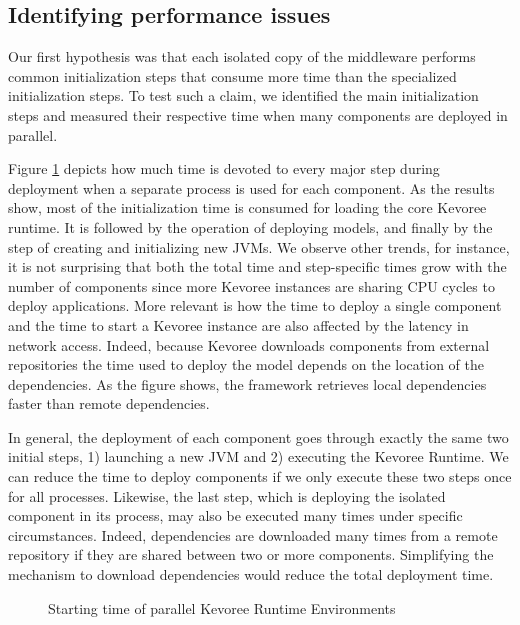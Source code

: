 \subsection{Identifying performance issues} \label{sec:bottlenecks}
Our first hypothesis was that each isolated copy of the middleware performs common initialization steps that consume more time than the specialized initialization steps.
To test such a claim, we identified the main initialization steps and measured their respective time when many components are deployed in parallel.
 
Figure \ref{fig:starting-kevorees-motivation} depicts how much time is devoted to every major step during deployment when a separate process is used for each component.
As the results show, most of the initialization time is consumed for loading the core Kevoree runtime. It is followed by the operation of deploying models, and finally by the step of creating and initializing new JVMs.
We observe other trends, for instance, it is not surprising that both the total time and step-specific times grow with the number of components since more Kevoree instances are sharing CPU cycles to deploy applications.
More relevant is how the time to deploy a single component and the time to start a Kevoree instance are also affected by the latency in network access.
Indeed, because Kevoree downloads components from external repositories the time used to deploy the model depends on the location of the dependencies.
As the figure shows, the framework retrieves local dependencies faster than remote dependencies. 

In general, the deployment of each component goes through exactly the same two initial steps, 1) launching a new JVM and 2) executing the Kevoree Runtime.
We can reduce the time to deploy components if we only execute these two steps once for all processes.
Likewise, the last step, which is deploying the isolated component in its process, may also be executed many times under specific circumstances.
Indeed, dependencies are downloaded many times from a remote repository if they are shared between two or more components.
Simplifying the mechanism to download dependencies would reduce the total deployment time.

\begin{figure}[t!]
\centering

\caption{Starting time of parallel Kevoree Runtime Environments}
\label{fig:starting-kevorees-motivation}
\end{figure}

